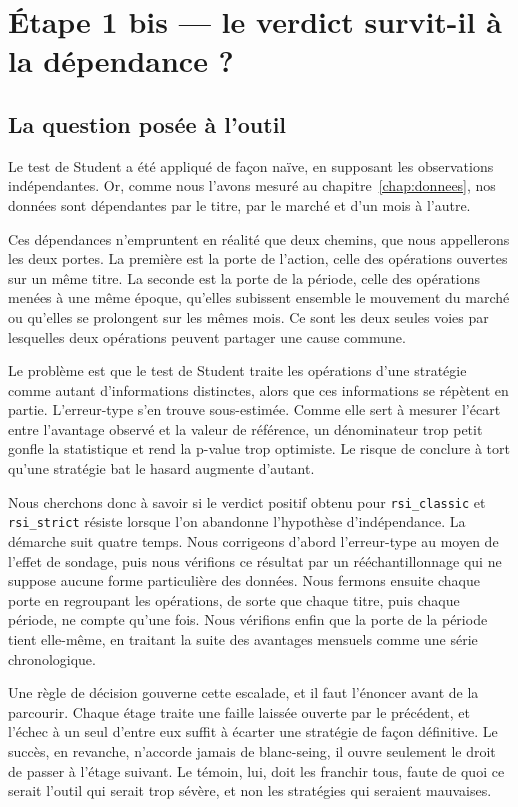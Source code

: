 \section{Étape 1 bis --- le verdict survit-il à la dépendance ?}
\label{sec:b1-dependance}

\subsection{La question posée à l'outil}

Le test de Student a été appliqué de façon naïve, en supposant les
observations indépendantes. Or, comme nous l'avons mesuré au
chapitre~\ref{chap:donnees}, nos données sont dépendantes par le titre, par le
marché et d'un mois à l'autre.

Ces dépendances n'empruntent en réalité que deux chemins, que nous appellerons
les deux portes. La première est la porte de l'action, celle des opérations
ouvertes sur un même titre. La seconde est la porte de la période, celle des
opérations menées à une même époque, qu'elles subissent ensemble le mouvement
du marché ou qu'elles se prolongent sur les mêmes mois. Ce sont les deux
seules voies par lesquelles deux opérations peuvent partager une cause
commune.

Le problème est que le test de Student traite les opérations d'une stratégie
comme autant d'informations distinctes, alors que ces informations se
répètent en partie. L'erreur-type s'en trouve sous-estimée. Comme elle sert à
mesurer l'écart entre l'avantage observé et la valeur de référence, un
dénominateur trop petit gonfle la statistique et rend la p-value trop
optimiste. Le risque de conclure à tort qu'une stratégie bat le hasard
augmente d'autant.

Nous cherchons donc à savoir si le verdict positif obtenu pour
\texttt{rsi\_classic} et \texttt{rsi\_strict} résiste lorsque l'on abandonne
l'hypothèse d'indépendance. La démarche suit quatre temps. Nous corrigeons
d'abord l'erreur-type au moyen de l'effet de sondage, puis nous vérifions ce
résultat par un rééchantillonnage qui ne suppose aucune forme particulière des
données. Nous fermons ensuite chaque porte en regroupant les opérations, de
sorte que chaque titre, puis chaque période, ne compte qu'une fois. Nous
vérifions enfin que la porte de la période tient elle-même, en traitant la
suite des avantages mensuels comme une série chronologique.

Une règle de décision gouverne cette escalade, et il faut l'énoncer avant de
la parcourir. Chaque étage traite une faille laissée ouverte par le
précédent, et l'échec à un seul d'entre eux suffit à écarter une stratégie de
façon définitive. Le succès, en revanche, n'accorde jamais de blanc-seing, il
ouvre seulement le droit de passer à l'étage suivant. Le témoin, lui, doit les
franchir tous, faute de quoi ce serait l'outil qui serait trop sévère, et non
les stratégies qui seraient mauvaises.

